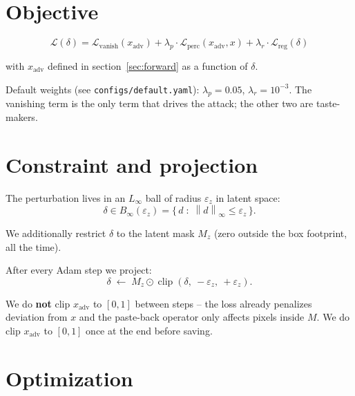 \documentclass[11pt,a4paper]{article}
\newcommand{\norm}[1]{\left\lVert#1\right\rVert}
\DeclareMathOperator{\clip}{clip}
\begin{document}
\section{Objective}\label{sec:obj}

\begin{equation}
\boxed{\;
\mathcal{L}(\delta)
 = \mathcal{L}_{\text{vanish}}(x_{\text{adv}})
 + \lambda_p \cdot \mathcal{L}_{\text{perc}}(x_{\text{adv}}, x)
 + \lambda_r \cdot \mathcal{L}_{\text{reg}}(\delta)
\;}
\end{equation}

\noindent with $x_{\text{adv}}$ defined in section~\ref{sec:forward} as a function
of $\delta$.

\noindent Default weights (see \texttt{configs/default.yaml}): $\lambda_p = 0.05$,
$\lambda_r = 10^{-3}$. The vanishing term is the only term that drives the
attack; the other two are taste-makers.

\section{Constraint and projection}\label{sec:projection}

The perturbation lives in an $L_\infty$ ball of radius $\varepsilon_z$ in
latent space:
\begin{equation}
\delta \in B_\infty(\varepsilon_z) = \bigl\{\, d \;:\; \norm{d}_\infty \leq \varepsilon_z \,\bigr\}.
\end{equation}

\noindent We additionally restrict $\delta$ to the latent mask $M_z$ (zero outside
the box footprint, all the time).

After every Adam step we project:
\begin{equation}
\delta \;\leftarrow\; M_z \odot \clip(\delta,\ -\varepsilon_z,\ +\varepsilon_z).
\label{eq:project}
\end{equation}

We do \textbf{not} clip $x_{\text{adv}}$ to $[0,1]$ between steps -- the loss
already penalizes deviation from $x$ and the paste-back operator only affects
pixels inside $M$. We do clip $x_{\text{adv}}$ to $[0,1]$ once at the end
before saving.

\section{Optimization}\label{sec:optim}
\end{document}
